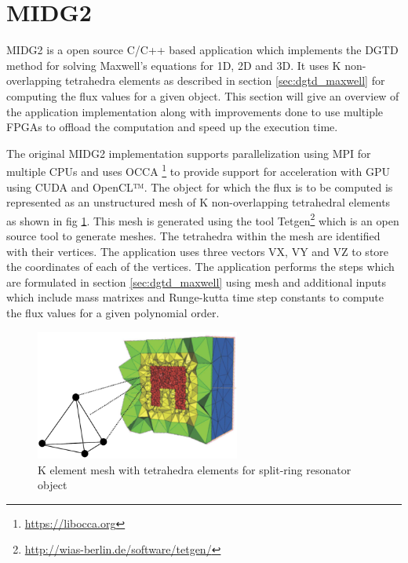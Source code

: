 \section{\acf{MIDG2}}

\ac{MIDG2} is a open source C/C++ based application which implements the \ac{DGTD} method for solving
Maxwell's equations for 1D, 2D and 3D. It uses K non-overlapping tetrahedra elements as described in
section \ref{sec:dgtd_maxwell} for computing the flux values for a given object. This section
will give an overview of the application implementation along with improvements done to use 
multiple FPGAs to offload the computation and speed up the execution time.

The original MIDG2 implementation supports parallelization using \ac{MPI} for multiple CPUs and
uses OCCA \footnote{\url{https://libocca.org}} to provide support for acceleration with GPU
using CUDA and OpenCL™. The object for which the flux is to be computed is represented as
an unstructured mesh of K non-overlapping tetrahedral elements as shown in fig \ref{fig:mesh}.
This mesh is generated using the tool Tetgen\footnote{\url{http://wias-berlin.de/software/tetgen/}}
which is an open source tool to generate meshes. The tetrahedra within the mesh are
identified with their vertices. The application uses three vectors VX, VY and VZ
to store the coordinates of each of the vertices. The application performs the steps
which are formulated in section \ref{sec:dgtd_maxwell} using mesh and additional
inputs which include mass matrixes and Runge-kutta time step constants to compute the
flux values for a given polynomial order.
\begin{figure}[h]%
    \centering
    \includegraphics[width=0.6\textwidth]{images/mesh}
    \caption{K element mesh with tetrahedra elements for split-ring resonator object}
    \label{fig:mesh}
\end{figure}

